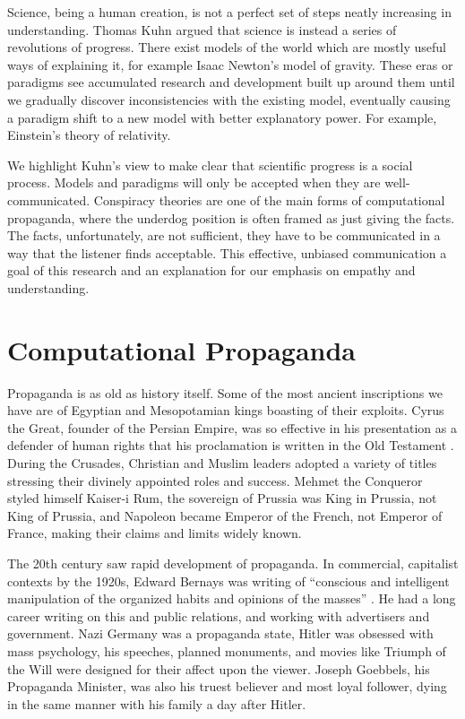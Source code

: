 \documentclass[doublespacing]{utdthesis}
\let\cite=\citep
\begin{document}
Science, being a human creation, is not a perfect set of steps neatly increasing in understanding.
Thomas Kuhn \citeyear{kuhn1970} argued that science is instead a series of revolutions of progress.
There exist models of the world which are mostly useful ways of explaining it, for example Isaac Newton's model of gravity.
These eras or paradigms see accumulated research and development built up around them until we gradually discover inconsistencies with the existing model,
eventually causing a paradigm shift to a new model with better explanatory power.
For example, Einstein's theory of relativity.

We highlight Kuhn's view to make clear that scientific progress is a social process.
Models and paradigms will only be accepted when they are well-communicated.
Conspiracy theories are one of the main forms of computational propaganda, where the underdog position is often framed as just giving the facts.
The facts, unfortunately, are not sufficient, they have to be communicated in a way that the listener finds acceptable.
This effective, unbiased communication a goal of this research and an explanation for our emphasis on empathy and understanding.

\section{Computational Propaganda}

Propaganda is as old as history itself.
Some of the most ancient inscriptions we have are of Egyptian and Mesopotamian kings boasting of their exploits.
Cyrus the Great, founder of the Persian Empire, was so effective in his presentation as a defender of human rights that his proclamation is written in the Old Testament \cite[Ezra 6]{bible}.
During the Crusades, Christian and Muslim leaders adopted a variety of titles stressing their divinely appointed roles and success.
Mehmet the Conqueror styled himself Kaiser-i Rum, the sovereign of Prussia was King in Prussia, not King of Prussia, and Napoleon became Emperor of the French, not Emperor of France, making their claims and limits widely known.

The 20th century saw rapid development of propaganda.
In commercial, capitalist contexts by the 1920s, Edward Bernays was writing of ``conscious and intelligent manipulation of the organized habits and opinions of the masses'' \cite{bernays2005}.
He had a long career writing on this and public relations, and working with advertisers and government.
Nazi Germany was a propaganda state, Hitler was obsessed with mass psychology, his speeches, planned monuments, and movies like Triumph of the Will were designed for their affect upon the viewer.
Joseph Goebbels, his Propaganda Minister, was also his truest believer and most loyal follower, dying in the same manner with his family a day after Hitler.
\end{document}

